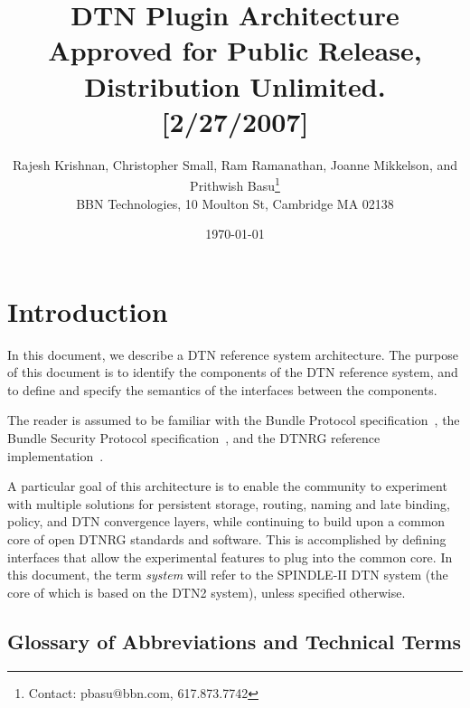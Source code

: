 \documentclass[11pt]{article}
\begin{document}
 

\title{DTN Plugin Architecture \\
{\large Approved for Public Release, Distribution Unlimited.  [2/27/2007]}
} 

\author{Rajesh Krishnan, Christopher Small, Ram Ramanathan, Joanne Mikkelson, 
and Prithwish Basu\thanks{Contact: pbasu@bbn.com, 617.873.7742}\\ 
BBN Technologies, 10 Moulton St, Cambridge MA 02138} 
\date{\today}
\maketitle

\tableofcontents
\newpage
\section{Introduction} \label{sec:intro}

In this document, we describe a DTN reference system architecture.  The purpose
of this document is to identify the components of the DTN reference system, 
and to define and specify the semantics of the interfaces between the 
components.  

The reader is assumed to be familiar with the Bundle Protocol
specification~\cite{BP-ID}, the Bundle Security Protocol
specification~\cite{BSP-ID}, and the DTNRG reference
implementation~\cite{DTN2}.  

A particular goal of this architecture is to enable the community to experiment
with multiple solutions for persistent storage, routing, naming and late
binding, policy, and DTN convergence layers, while continuing to build upon a
common core of open DTNRG standards and software. This is accomplished by
defining interfaces that allow the experimental features to plug into the
common core.  In this document, the term {\em system} will refer to the
SPINDLE-II DTN system (the core of which is based on the DTN2 system), unless
specified otherwise.  

\subsection{Glossary of Abbreviations and Technical Terms} \label{sec:glossary}
\end{document}
